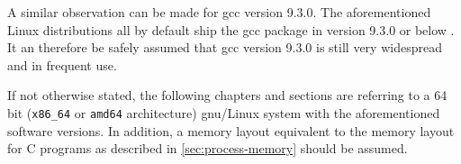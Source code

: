 A similar observation can be made for \gls{gcc} version 9.3.0.
The aforementioned Linux distributions all by default ship the \gls{gcc} package in version 9.3.0 or below \cite{RedHat2020a,Canonical2020a,SPI2020b}.
It an therefore be safely assumed that \gls{gcc} version 9.3.0 is still very widespread and in frequent use.

If not otherwise stated, the following chapters and sections are referring to a 64 bit (\texttt{x86\_64} or \texttt{amd64} architecture) \acrshort{gnu}/Linux system with the aforementioned software versions.
In addition, a memory layout equivalent to the memory layout for C programs as described in \cref{sec:process-memory} should be assumed.
